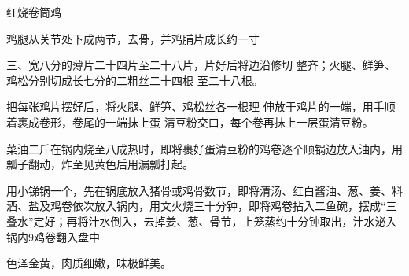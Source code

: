 \begin{recipe}{红烧卷筒鸡}

\ingredients



\cooking

\step 鸡腿从关节处下成两节，去骨，并鸡脯片成长约一寸

三、宽八分的薄片二十四片至二十八片，片好后将边沿修切 整齐；火腿、鲜笋、鸡松分别切成长七分的二粗丝二十四根 至二十八根。

把每张鸡片摆好后，将火腿、鲜笋、鸡松丝各一根理 伸放于鸡片的一端，用手顺着裹成卷形，卷尾的一端抹上蛋 清豆粉交口，每个卷再抹上一层蛋清豆粉。

\step 菜油二斤在锅内烧至八成热时，即将裹好蛋清豆粉的鸡卷逐个顺锅边放入油内，用瓢子翻动，炸至见黄色后用漏瓢打起。

\step 用小锑锅一个，先在锅底放入猪骨或鸡骨数节，即将清汤、红白酱油、葱、姜、料酒、盐及鸡卷依次放入锅内，用文火烧三十分钟，即将鸡卷拈入二鱼碗，摆成“三叠水”定好；再将汁水倒入，去掉姜、葱、骨节，上笼蒸约十分钟取出，汁水泌入锅内9鸡卷翻入盘中

\notes

色泽金黄，肉质细嫩，味极鲜美。

\end{recipe}

